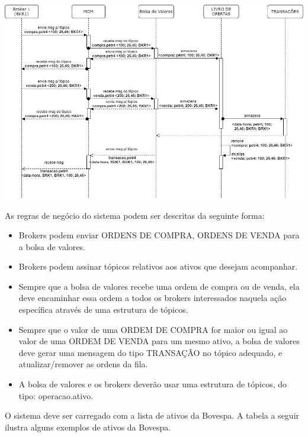 \documentclass[12pt,brazil, a4paper, fullpage]{article}
\begin{document}
\begin{center}
    \includegraphics[width=.93\textwidth]{bolsadevalores.png} \\
\end{center}

As regras de negócio do sistema podem ser descritas da seguinte forma:

\begin{itemize}
    \item Brokers podem enviar ORDENS DE COMPRA, ORDENS DE VENDA para a bolsa de valores.
    \item Brokers podem assinar tópicos relativos aos ativos que desejam acompanhar.
    \item Sempre que a bolsa de valores recebe uma ordem de compra ou de venda, ela deve encaminhar essa ordem a todos os brokers interessados naquela ação específica através de uma estrutura de tópicos.
    \item Sempre que o valor de uma ORDEM DE COMPRA for maior ou igual ao valor de uma ORDEM DE VENDA para um mesmo ativo, a bolsa de valores deve gerar uma mensagem do tipo TRANSAÇÃO no tópico adequado, e atualizar/remover as ordens da fila.
    \item A bolsa de valores e os brokers deverão usar uma estrutura de tópicos, do tipo: operacao.ativo.
\end{itemize}

O sistema deve ser carregado com a lista de ativos da Bovespa. A tabela a seguir ilustra alguns exemplos de ativos da Bovespa.
\end{document}
